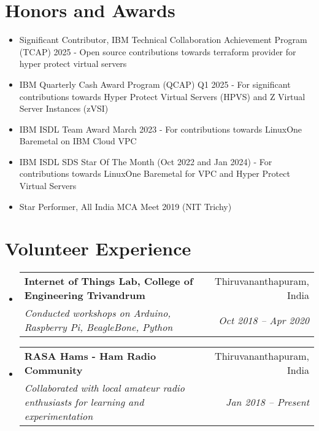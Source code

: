 \documentclass[a4paper,20pt]{article}
\makeatletter
\newcommand{\resumeSubheading}[4]{
  \vspace{-1pt}\item
  \begin{tabular*}{0.97\textwidth}{l@{\extracolsep{\fill}}r}
    \textbf{#1} & #2 \\
    \textit{#3} & \textit{#4} \\
  \end{tabular*}\vspace{-5pt}
}
\newcommand{\resumeSubHeadingListStart}{\begin{itemize}[leftmargin=*]}
\newcommand{\resumeSubHeadingListEnd}{\end{itemize}}
\makeatother
\begin{document}
\section{Honors and Awards}
    \begin{itemize}
        \item Significant Contributor, IBM Technical Collaboration Achievement Program (TCAP) 2025 - Open source contributions towards terraform provider for hyper protect virtual servers
        \item IBM Quarterly Cash Award Program (QCAP) Q1 2025 - For significant contributions towards Hyper Protect Virtual Servers (HPVS) and Z Virtual Server Instances (zVSI)
        \item IBM ISDL Team Award March 2023 - For contributions towards LinuxOne Baremetal on IBM Cloud VPC 
        \item IBM ISDL SDS Star Of The Month (Oct 2022 and Jan 2024) - For contributions towards LinuxOne Baremetal for VPC and Hyper Protect Virtual Servers
        \item Star Performer, All India MCA Meet 2019 (NIT Trichy)
    \end{itemize}

\vspace{+5pt}
\section{Volunteer Experience}
\resumeSubHeadingListStart
    \resumeSubheading
        {Internet of Things Lab, College of Engineering Trivandrum}{Thiruvananthapuram, India}
        {Conducted workshops on Arduino, Raspberry Pi, BeagleBone, Python}{Oct 2018 -- Apr 2020}
    \resumeSubheading
        {RASA Hams - Ham Radio Community}{Thiruvananthapuram, India}
        {Collaborated with local amateur radio enthusiasts for learning and experimentation}{Jan 2018 -- Present}
    \resumeSubHeadingListEnd
\end{document}
